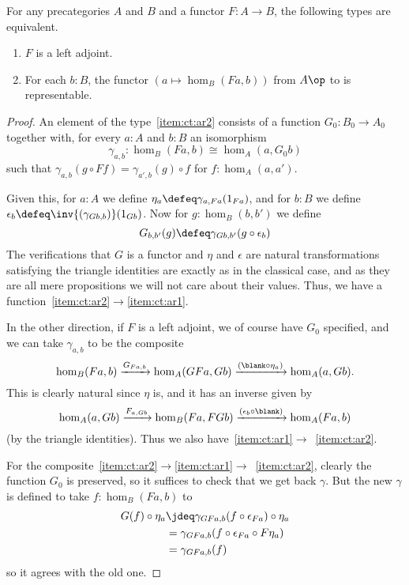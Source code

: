 \begin{lem}\label{ct:adj-repr}
  For any precategories $A$ and $B$ and a functor $F:A\to B$, the following types are equivalent.
  \begin{enumerate}
  \item $F$ is a left adjoint.\label{item:ct:ar1}
  \item For each $b:B$, the functor $(a \mapsto \hom_B(Fa,b))$ from $A\op$ to \uset is representable.\label{item:ct:ar2}
  \end{enumerate}
\end{lem}
\begin{proof}
  An element of the type~\ref{item:ct:ar2} consists of a function $G_0:B_0 \to A_0$ together with, for every $a:A$ and $b:B$ an isomorphism
  \[ \gamma_{a,b}:\hom_B(Fa,b) \cong \hom_A(a,G_0 b) \]
  such that $\gamma_{a,b}(g \circ Ff) = \gamma_{a',b}(g)\circ f$ for $f:\hom_{A}(a,a')$.

  Given this, for $a:A$ we define $\eta_a \defeq \gamma_{a,Fa}(1_{Fa})$, and for $b:B$ we define $\epsilon_b \defeq \inv{(\gamma_{Gb,b})}(1_{Gb})$.
  Now for $g:\hom_B(b,b')$ we define
  \[ G_{b,b'}(g) \defeq \gamma_{G b, b'}(g \circ \epsilon_b) \]
  The verifications that $G$ is a functor and $\eta$ and $\epsilon$ are natural transformations satisfying the triangle identities are exactly as in the classical case, and as they are all mere propositions we will not care about their values.
  Thus, we have a function~\ref{item:ct:ar2}$\to$\ref{item:ct:ar1}.

  In the other direction, if $F$ is a left adjoint, we of course have $G_0$ specified, and we can take $\gamma_{a,b}$ to be the composite
  \[ \hom_B(Fa,b)
  \xrightarrow{G_{Fa,b}} \hom_A(GFa,Gb)
  \xrightarrow{(\blank\circ \eta_a)} \hom_A(a,Gb).
  \]
  This is clearly natural since $\eta$ is, and it has an inverse given by
  \[ \hom_A(a,Gb)
  \xrightarrow{F_{a,Gb}} \hom_B(Fa,FGb)
  \xrightarrow{(\epsilon_b \circ \blank )} \hom_A(Fa,b)
  \]
  (by the triangle identities).
  Thus we also have~\ref{item:ct:ar1}$\to$~\ref{item:ct:ar2}.

  For the composite~\ref{item:ct:ar2}$\to$\ref{item:ct:ar1}$\to$~\ref{item:ct:ar2}, clearly the function $G_0$ is preserved, so it suffices to check that we get back $\gamma$.
  But the new $\gamma$ is defined to take $f:\hom_B(Fa,b)$ to
  \begin{align*}
    G(f) \circ \eta_a
    &\jdeq \gamma_{G Fa, b}(f \circ \epsilon_{Fa}) \circ \eta_a\\
    &= \gamma_{G Fa, b}(f \circ \epsilon_{Fa} \circ F\eta_a)\\
    &= \gamma_{G Fa, b}(f)
  \end{align*}
  so it agrees with the old one.


\end{proof}
